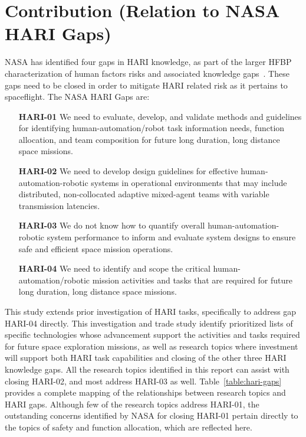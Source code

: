 \section{Contribution (Relation to NASA HARI Gaps)}
NASA has identified four gaps in HARI knowledge, as part of the larger HFBP characterization of human factors risks and associated knowledge gaps~\citep{hari_risk}.
These gaps need to be closed in order to mitigate HARI related risk as it pertains to spaceflight.
The NASA HARI Gaps are:
\begin{itemize}
    \item[\textbf{HARI-01}] We need to evaluate, develop, and validate methods and guidelines for identifying human-automation/robot task information needs, function allocation, and team composition for future long duration, long distance space missions.
    \item[\textbf{HARI-02}] We need to develop design guidelines for effective human-automation-robotic systems in operational environments that may include distributed, non-collocated adaptive mixed-agent teams with variable transmission latencies.
    \item[\textbf{HARI-03}] We do not know how to quantify overall human-automation-robotic system performance to inform and evaluate system designs to ensure safe and efficient space mission operations.
    \item[\textbf{HARI-04}] We need to identify and scope the critical human-automation/robotic mission activities and tasks that are required for future long duration, long distance space missions.
\end{itemize}

This study extends prior investigation of HARI tasks, specifically to address gap HARI-04 directly.
This investigation and trade study identify prioritized lists of specific technologies whose advancement support the activities and tasks required for future space exploration missions, as well as research topics where investment will support both HARI task capabilities and closing of the other three HARI knowledge gaps.
All the research topics identified in this report can assist with closing HARI-02, and most address HARI-03 as well.
Table~\ref{table:hari-gaps} provides a complete mapping of the relationships between research topics and HARI gaps.
Although few of the research topics address HARI-01, the outstanding concerns identified by NASA for closing HARI-01 pertain directly to the topics of safety and function allocation, which are reflected here.

